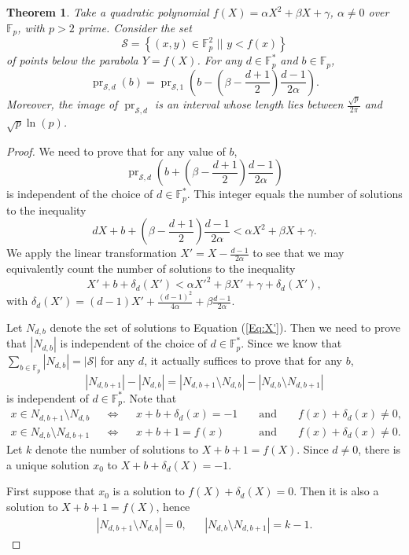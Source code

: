\documentclass[10pt,a4paper]{amsart}
\newtheorem{thm}{Theorem}
\newcommand{\FF}{\mathbb F}
\newcommand{\ms}{\mathcal S}
\DeclareMathOperator{\pr}{pr}
\newcommand{\sett}[2]{ \left\{ #1 \, \, || \, \, #2 \right \} }
\begin{document}
\begin{thm}
 \label{Thm:Parabola}
 Take a quadratic polynomial $f(X) = \alpha X^2 + \beta X + \gamma$, $\alpha \neq 0$ over $\FF_p$, with $p > 2$ prime.
 Consider the set
 \[
  \ms = \sett{(x,y) \in \FF_p^2}{ y < f(x)}
 \]
 of points below the parabola $Y = f(X)$.
 For any $d \in \FF_p^*$ and $b \in \FF_p$,
 \[
  \pr_{\ms,d}(b) = \pr_{\ms,1}\left( b - \left(\beta-\frac{d+1}2\right)\frac{d-1}{2\alpha} \right).
 \]
 Moreover, the image of $\pr_{\ms,d}$ is an interval whose length lies between $\frac{\sqrt p}{2 \pi}$ and $\sqrt p \ln(p)$.
\end{thm}

\begin{proof}
 We need to prove that for any value of $b$,
 \[
  \pr_{\ms,d}\left( b + \left(\beta-\frac{d+1}2\right)\frac{d-1}{2\alpha} \right)
 \]
 is independent of the choice of $d \in \FF_p^*$.
 This integer equals the number of solutions to the inequality
 \[
  dX + b + \left(\beta-\frac{d+1}2\right)\frac{d-1}{2\alpha} < \alpha X^2 + \beta X + \gamma.
 \]
 We apply the linear transformation $X' = X - \frac{d-1}{2\alpha}$ to see that we may equivalently count the number of solutions to the inequality
 \begin{equation}
  \label{Eq:X'}
  X' + b + \delta_d(X') < \alpha X'^2 + \beta X' + \gamma + \delta_d(X'),
 \end{equation}
 with $\delta_d(X') = (d-1) X' + \frac{(d-1)^2}{4\alpha} + \beta \frac{d-1}{2\alpha}$.
 
 Let $N_{d,b}$ denote the set of solutions to Equation (\ref{Eq:X'}).
 Then we need to prove that $|N_{d,b}|$ is independent of the choice of $d \in \FF_p^*$.
 Since we know that $\sum_{b \in \FF_p} |N_{d,b}| = |\ms|$ for any $d$, it actually suffices to prove that for any $b$,
 \[
  |N_{d,b+1}|-|N_{d,b}| = |N_{d,b+1} \setminus N_{d,b}| - |N_{d,b} \setminus N_{d,b+1}|
 \]
 is independent of $d \in \FF_p^*$.
 Note that
 \begin{align*}
  x \in N_{d,b+1} \setminus N_{d,b} && \iff && x+b+\delta_d(x)=-1 && \text{ and } && f(x) + \delta_d(x) \neq 0, \\
  x \in N_{d,b} \setminus N_{d,b+1} && \iff && x+b+1=f(x) && \text{ and } && f(x) + \delta_d(x) \neq 0.
 \end{align*}
 Let $k$ denote the number of solutions to $X+b+1 = f(X)$.
 Since $d \neq 0$, there is a unique solution $x_0$ to $X + b + \delta_d(X) = -1$.
 
 First suppose that $x_0$ is a solution to $f(X) + \delta_d(X) = 0$.
 Then it is also a solution to $X+b+1 = f(X)$, hence
 \begin{align*}
  |N_{d,b+1} \setminus N_{d,b}| = 0, &&
  |N_{d,b} \setminus N_{d,b+1}| = k-1.
 \end{align*}


\end{proof}
\end{document}

